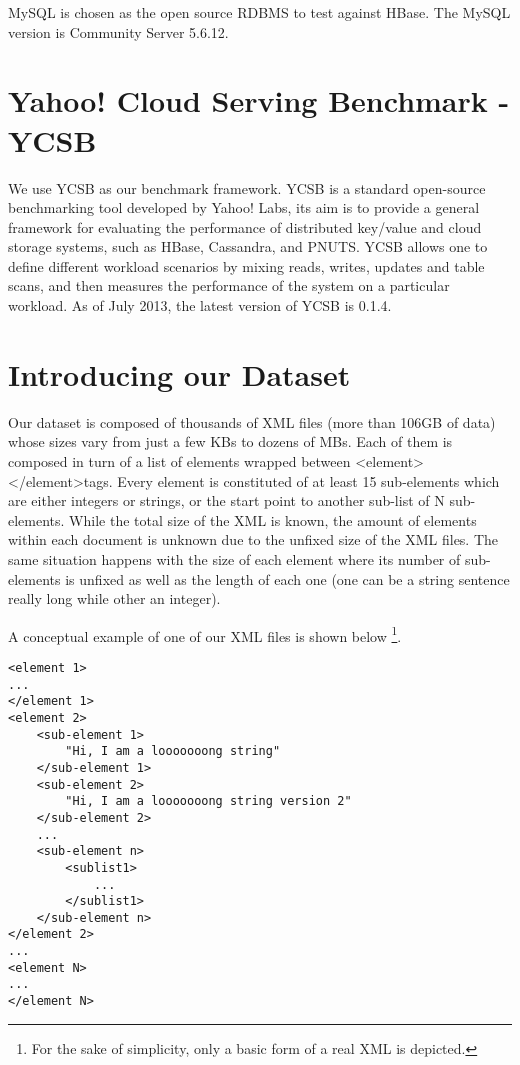 MySQL \cite{MySQL} is chosen as the open source RDBMS to test against HBase. The MySQL version is Community Server 5.6.12.

\section{Yahoo! Cloud Serving Benchmark - YCSB}

We use YCSB as our benchmark framework. YCSB\cite{cooper2010benchmarking} is a standard open-source benchmarking tool developed by Yahoo! Labs, its aim is to provide a general framework for evaluating the performance of distributed key/value and cloud storage systems, such as HBase, Cassandra, and PNUTS. YCSB allows one to define different workload scenarios by mixing reads, writes, updates and table scans, and then measures the performance of the system on a particular workload. As of July 2013, the latest version of YCSB is 0.1.4.

\section{Introducing our Dataset}

Our dataset is composed of thousands of XML files (more than 106GB of data) whose sizes vary from just a few KBs to dozens of MBs. Each of them is composed in turn of a list of elements wrapped between \textless element\textgreater\textless /element\textgreater tags. Every element is constituted of at least 15 sub-elements which are either integers or strings, or the start point to another sub-list of N sub-elements. While the total size of the XML is known, the amount of elements within each document is unknown due to the unfixed size of the XML files. The same situation happens with the size of each element where its number of sub-elements is unfixed as well as the length of each one (one can be a string sentence really long while other an integer). 
\par
A conceptual example of one of our XML files is shown below \footnote{For the sake of simplicity, only a basic form of a real XML is depicted.}.

\lstset{language=XML, basicstyle=\footnotesize, numbers=left, breaklines=true, xleftmargin=5.0ex}
\begin{lstlisting}
<element 1>
...
</element 1>
<element 2>
	<sub-element 1>
		"Hi, I am a looooooong string"
	</sub-element 1>
	<sub-element 2>
		"Hi, I am a looooooong string version 2"
	</sub-element 2>
	...
	<sub-element n>
		<sublist1>
			...
		</sublist1>
	</sub-element n>
</element 2>
...
<element N>
...
</element N>
\end{lstlisting}


